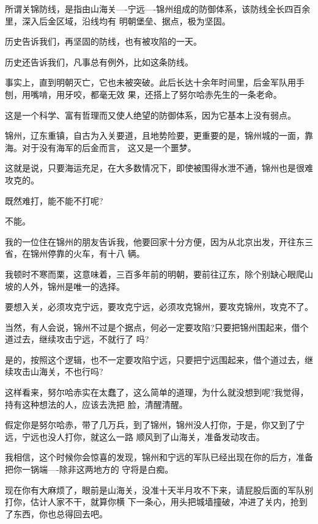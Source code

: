 \documentclass[11pt,a4paper,onecolumn]{article}
\begin{document}
所谓关锦防线，是指由山海关----宁远----锦州组成的防御体系，该防线全长四百余里，深入后金区域，沿线均有
明朝堡垒、据点，极为坚固。

历史告诉我们，再坚固的防线，也有被攻陷的一天。

历史还告诉我们，凡事总有例外，比如这条防线。

事实上，直到明朝灭亡，它也未被突破。此后长达十余年时间里，后金军队用手刨，用嘴啃，用牙咬，都毫无效
果，还搭上了努尔哈赤先生的一条老命。

这是一个科学、富有哲理而又使人绝望的防御体系，因为它基本上没有弱点。

锦州，辽东重镇，自古为入关要道，且地势险要，更重要的是，锦州城的一面，靠海。对于没有海军的后金而言，
这又是一个噩梦。

这就是说，只要海运充足，在大多数情况下，即使被围得水泄不通，锦州也是很难攻克的。

既然难打，能不能不打呢?

不能。

我的一位住在锦州的朋友告诉我，他要回家十分方便，因为从北京出发，开往东三省，在锦州停靠的火车，有十八
辆。

我顿时不寒而栗，这意味着，三百多年前的明朝，要前往辽东，除个别缺心眼爬山坡的人外，锦州是唯一的选择。

要想入关，必须攻克宁远，要攻克宁远，必须攻克锦州，要攻克锦州，攻克不了。

当然，有人会说，锦州不过是个据点，何必一定要攻陷?只要把锦州围起来，借个道过去，继续攻击宁远，不就行了
吗?

是的，按照这个逻辑，也不一定要攻陷宁远，只要把宁远围起来，借个道过去，继续攻击山海关，不也行吗?

这样看来，努尔哈赤实在太蠢了，这么简单的道理，为什么就没想到呢?我觉得，持有这种想法的人，应该去洗把
脸，清醒清醒。

假定你是努尔哈赤，带了几万兵，到了锦州，锦州没人打你，于是，你又到了宁远，宁远也没人打你，就这么一路
顺风到了山海关，准备发动攻击。

我相信，这个时候你会惊喜的发现，锦州和宁远的军队已经出现在你的后方，准备把你一锅端----除非这两地方的
守将是白痴。

现在你有大麻烦了，眼前是山海关，没准十天半月攻不下来，请屁股后面的军队别打你，估计人家不干，就算你横
下一条心，用头把城墙撞破，冲进了关内，抢到了东西，你也总得回去吧。

\section[\thesection]{}
\end{document}
